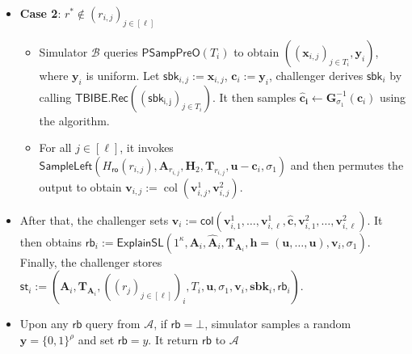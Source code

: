\begin{itemize}
\begin{itemize}
\item For the remaining $j \in [\ell], j \neq j^*$, which means $r_{i,j} \neq r^*$, it finds $\mathbf{v}_{i,j}$ by calling
$\mathsf{SampleLeft}\!\left(
H_{\mathsf{ro}}(r_{i,j}),
\mathbf{A}_{r_{i,j}},
\mathbf{H}_2,
\mathbf{T}_{r_{i,j}},
\mathbf{u}-\mathbf{c}_i,
\sigma_1
\right)$ and then permutes the output components to obtain $\mathbf{v}_{i,j}:= \operatorname{col}(\mathbf{v}_{i,j}^1,\mathbf{v}_{i,j}^2)$
\end{itemize}
\item \textbf{Case 2}: $r^* \notin (r_{i,j})_{j \in [\ell]}$
\begin{itemize}
    \item Simulator $\mathcal{B}$ queries $\mathsf{PSampPreO}(T_i)$ to obtain 
    $((\mathbf{x}_{i,j})_{j \in T_i}, \mathbf{y}_i)$, where $\mathbf{y}_i$ is uniform. Let $\mathsf{sbk}_{i,j} := \mathbf{x}_{i,j}$, $\mathbf{c}_{i} := \mathbf{y}_{i}$, challenger  derives $\mathsf{sbk}_i$ by calling $\mathsf{TBIBE.Rec}((\mathsf{sbk_{i,j}})_{j \in T_i})$. It then samples $\mathbf{\hat{c}_i} \leftarrow \mathbf{G}^{-1}_{\sigma_1}(\mathbf{c}_i)$ using the algorithm. 
    \item For all $j \in [\ell]$, it invokes $\mathsf{SampleLeft}\!\left(
H_{\mathsf{ro}}(r_{i,j}),
\mathbf{A}_{r_{i,j}},
\mathbf{H}_2,
\mathbf{T}_{r_{i,j}},
\mathbf{u}-\mathbf{c}_i,
\sigma_1
\right)$ and then permutes the output to obtain $\mathbf{v}_{i,j}:= \operatorname{col}(\mathbf{v}_{i,j}^1,\mathbf{v}_{i,j}^2)$.
\end{itemize}




    
    
\item After that, the challenger sets
\(\mathbf{v}_i :=
\mathsf{col}(\mathbf{v}_{i,1}^{1},\ldots,\mathbf{v}_{i,\ell}^{1},
\widehat{\mathbf{c}},
\mathbf{v}_{i,1}^{2},\ldots,\mathbf{v}_{i,\ell}^{2})\).
It then obtains
\(\mathsf{rb}_i :=
\mathsf{ExplainSL}(1^\kappa,
\mathbf{A}_i,
\widehat{\mathbf{A}}_i,
\mathbf{T}_{\mathbf{A}_i},
\mathbf{h}=(\mathbf{u},\ldots,\mathbf{u}),
\mathbf{v}_i,
\sigma_1)\).
Finally, the challenger stores
\(\mathsf{st}_i :=
(\mathbf{A}_i,
\mathbf{T}_{\mathbf{A}_i},
((r_j)_{j\in[\ell]})_i,
T_i,
\mathbf{u},
\sigma_1,
\mathbf{v}_i,
\mathbf{sbk}_i,
\mathsf{rb}_i)\).

\item Upon any $\mathsf{rb}$ query from $\mathcal{A}$, if $\mathsf{rb} = \bot$, simulator samples a random $\mathbf{y} = \{0,1\}^\rho$ and set $\mathsf{rb} = y$. It return $\mathsf{rb}$ to $\mathcal{A}$
\end{itemize}

